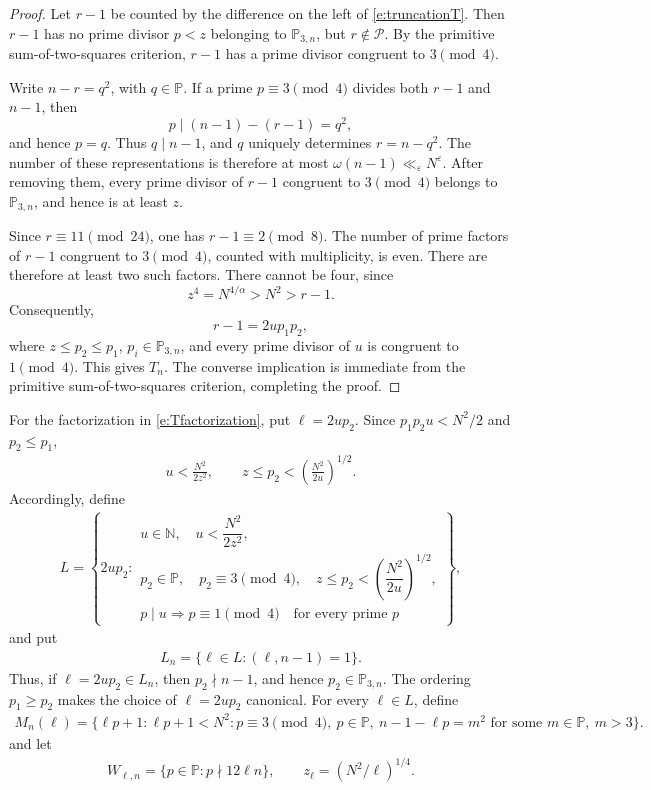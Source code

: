 \documentclass[12pt,reqno]{amsart}
\numberwithin{equation}{section}
\theoremstyle{definition}
\theoremstyle{remark}
\begin{document}
\begin{proof}
Let \(r-1\) be counted by the difference on the left of
\eqref{e:truncationT}.  Then \(r-1\) has no prime divisor
\(p<z\) belonging to \(\mathbb P_{3,n}\), but \(r\notin\mathcal P\).
By the primitive sum-of-two-squares criterion, \(r-1\) has a prime
divisor congruent to \(3\pmod4\).

Write \(n-r=q^2\), with \(q\in\mathbb P\).  If a prime
\(p\equiv3\pmod4\) divides both \(r-1\) and \(n-1\), then
\[
 p\mid(n-1)-(r-1)=q^2,
\]
and hence \(p=q\).  Thus
\(q\mid n-1\), and \(q\) uniquely determines \(r=n-q^2\).  The number
of these representations is therefore at most
\(\omega(n-1)\ll_\varepsilon N^\varepsilon\). 
After removing them, every prime divisor of \(r-1\) congruent to
\(3\pmod4\) belongs to \(\mathbb P_{3,n}\), and hence is at least \(z\).

Since \(r\equiv11\pmod{24}\), one has \(r-1\equiv2\pmod8\).  The
number of prime factors of \(r-1\) congruent to \(3\pmod4\), counted
with multiplicity, is even.  There are therefore at least two such
factors.  There cannot be four, since
\[
 z^4=N^{4/\alpha}>N^2>r-1.
\]
Consequently,
\[
 r-1=2up_1p_2,
\]
where \(z\leq p_2\leq p_1\), \(p_i\in\mathbb P_{3,n}\), and every
prime divisor of \(u\) is congruent to \(1\pmod4\).  This gives \(T_n\).
The converse implication is immediate from the primitive
sum-of-two-squares criterion, completing the proof.
\end{proof}



For the factorization in \eqref{e:Tfactorization}, put $\ell=2up_2.$
Since $p_1p_2u<N^2/2$ and $p_2\leq p_1$,
\begin{align*}
 u<\frac{N^2}{2z^2},\qquad
 z\leq p_2<\left(\frac{N^2}{2u}\right)^{1/2}.
\end{align*}
Accordingly, define
\begin{align}\label{e:defL}
 L=\left\{
 2up_2:
 \begin{array}{l}
  u\in\mathbb N,\quad
  u<\dfrac{N^2}{2z^2},\\[2mm]
  p_2\in\mathbb P,\quad p_2\equiv3\pmod4,\quad
  z\leq p_2<\left(\dfrac{N^2}{2u}\right)^{1/2},\\[2mm]
  p\mid u\Longrightarrow p\equiv1\pmod4
  \quad\text{for every prime }p
 \end{array}
 \right\},
\end{align}
and put
\begin{align}\label{e:defLn}
 L_n=\{\ell\in L:(\ell,n-1)=1\}.
\end{align}
Thus, if \(\ell=2up_2\in L_n\), then
\(p_2\nmid n-1\), and hence \(p_2\in\mathbb P_{3,n}\).
The ordering \(p_1\geq p_2\) makes the choice of \(\ell=2up_2\)
canonical.
For every $\ell\in L$, define
\begin{align}\label{e:defMn}
 M_n(\ell)
 =\{\ell p+1\colon \ell p+1<N^2:p\equiv3\pmod4,\ p\in\mathbb P,\
 n-1-\ell p=m^2\text{ for some }m\in\mathbb P,\ m>3\}.
\end{align}
and let
\begin{align}\label{e:defWln}
 W_{\ell,n}=\{p\in\mathbb P:p\nmid12\ell n\},\qquad
 z_\ell=(N^2/\ell)^{1/4}.
\end{align}
\end{document}
